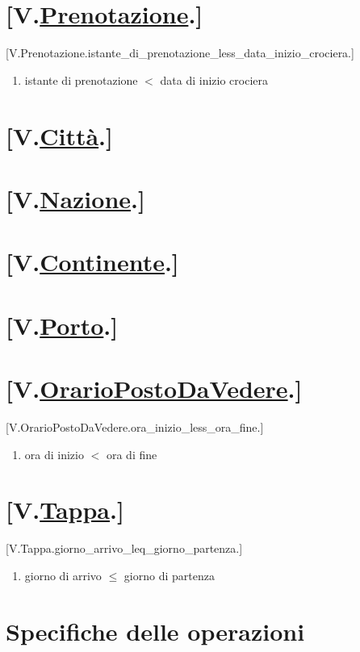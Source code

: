 \documentclass{article}
\begin{document}
\section*{[V.\hyperref[sec:Prenotazione]{Prenotazione}.]}\label{sec:VincoliPrenotazione}
    [V.Prenotazione.istante\_di\_prenotazione\_less\_data\_inizio\_crociera.]
    \begin{enumerate}
        \item istante di prenotazione $<$ data di inizio crociera
    \end{enumerate}
\section*{[V.\hyperref[sec:Città]{Città}.]}\label{sec:VincoliCittà}
\section*{[V.\hyperref[sec:Nazione]{Nazione}.]}\label{sec:VincoliNazione}
\section*{[V.\hyperref[sec:Continente]{Continente}.]}\label{sec:VincoliContinente}
\section*{[V.\hyperref[sec:Porto]{Porto}.]}\label{sec:VincoliPorto}
\section*{[V.\hyperref[sec:OrarioPostoDaVedere]{OrarioPostoDaVedere}.]}\label{sec:VincoliOrarioPostoDaVedere}
    [V.OrarioPostoDaVedere.ora\_inizio\_less\_ora\_fine.]
    \begin{enumerate}
        \item ora di inizio $<$ ora di fine
    \end{enumerate}
\section*{[V.\hyperref[sec:Tappa]{Tappa}.]}\label{sec:VincoliTappa}
    [V.Tappa.giorno\_arrivo\_leq\_giorno\_partenza.]
    \begin{enumerate}
        \item giorno di arrivo $\leq$ giorno di partenza
    \end{enumerate}

\newpage
\section{\label{sec:Operazioni}Specifiche delle operazioni}
\end{document}
